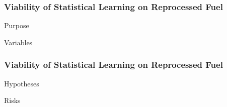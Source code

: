 
\begin{frame}
  \frametitle{Viability of Statistical Learning on Reprocessed Fuel}
  Purpose

  Variables
\end{frame}

\begin{frame}
  \frametitle{Viability of Statistical Learning on Reprocessed Fuel}
  Hypotheses

  Risks
\end{frame}

